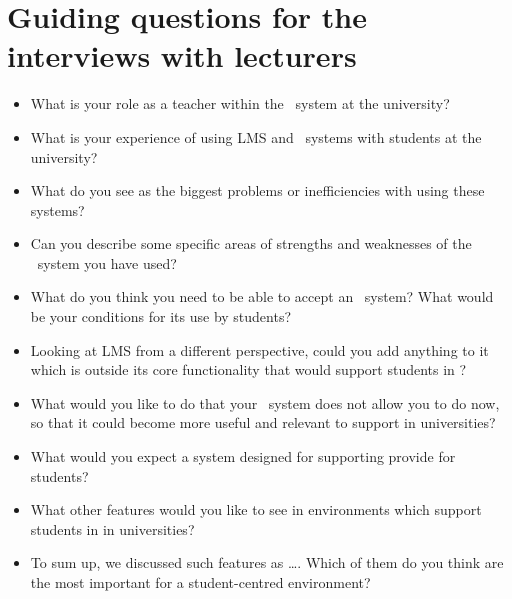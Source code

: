 \section{Guiding questions for the interviews with lecturers}
\label{sec:appquestlect}
\begin{itemize}
\item What is your role as a teacher within the \ep~system at the university?

\item What is your experience of using LMS and \ep~systems with students at the
university?

\item What do you see as the biggest problems or inefficiencies with using these
systems?

\item Can you describe some specific areas of strengths and weaknesses of the
\ep~system you have used?

\item What do you think you need to be able to accept an \ep~system? What
would be your conditions for its use by students?

\item Looking at LMS from a different perspective, could you add anything to it
which is outside its core functionality that would support students in \LLLsn?

\item What would you like to do that your \ep~system does not allow you to do
now, so that it could become more useful and relevant to \LLLs support in
universities?

\item What would you expect a system designed for supporting \LLLs provide for
students?

\item What other features would you like to see in environments which support
students in \LLLs in universities?

\item To sum up, we discussed such features as \ldots. Which of them do you
think are the most important for a student-centred \LLLs environment?
\end{itemize}



